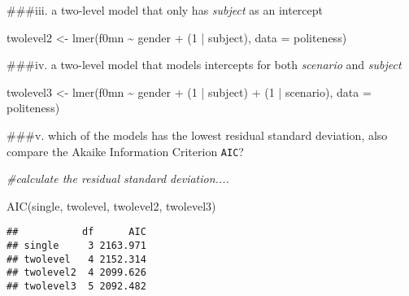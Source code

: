 \documentclass[
]{article}
\newenvironment{Shaded}{\begin{snugshade}}{\end{snugshade}}
\newcommand{\AttributeTok}[1]{\textcolor[rgb]{0.77,0.63,0.00}{#1}}
\newcommand{\CommentTok}[1]{\textcolor[rgb]{0.56,0.35,0.01}{\textit{#1}}}
\newcommand{\DecValTok}[1]{\textcolor[rgb]{0.00,0.00,0.81}{#1}}
\newcommand{\FunctionTok}[1]{\textcolor[rgb]{0.00,0.00,0.00}{#1}}
\newcommand{\NormalTok}[1]{#1}
\newcommand{\OtherTok}[1]{\textcolor[rgb]{0.56,0.35,0.01}{#1}}
\newcommand{\SpecialCharTok}[1]{\textcolor[rgb]{0.00,0.00,0.00}{#1}}
\begin{document}
\#\#\#iii. a two-level model that only has \emph{subject} as an
intercept

\begin{Shaded}
\begin{Highlighting}[]
\NormalTok{twolevel2 }\OtherTok{\textless{}{-}} \FunctionTok{lmer}\NormalTok{(f0mn }\SpecialCharTok{\textasciitilde{}}\NormalTok{ gender }\SpecialCharTok{+}\NormalTok{ (}\DecValTok{1} \SpecialCharTok{|}\NormalTok{ subject), }\AttributeTok{data =}\NormalTok{ politeness)}
\end{Highlighting}
\end{Shaded}

\#\#\#iv. a two-level model that models intercepts for both
\emph{scenario} and \emph{subject}

\begin{Shaded}
\begin{Highlighting}[]
\NormalTok{twolevel3 }\OtherTok{\textless{}{-}} \FunctionTok{lmer}\NormalTok{(f0mn }\SpecialCharTok{\textasciitilde{}}\NormalTok{ gender }\SpecialCharTok{+}\NormalTok{ (}\DecValTok{1} \SpecialCharTok{|}\NormalTok{ subject) }\SpecialCharTok{+}\NormalTok{ (}\DecValTok{1} \SpecialCharTok{|}\NormalTok{ scenario), }\AttributeTok{data =}\NormalTok{ politeness)}
\end{Highlighting}
\end{Shaded}

\#\#\#v. which of the models has the lowest residual standard deviation,
also compare the Akaike Information Criterion \texttt{AIC}?

\begin{Shaded}
\begin{Highlighting}[]
\CommentTok{\#calculate the residual standard deviation....}

\FunctionTok{AIC}\NormalTok{(single, twolevel, twolevel2, twolevel3)}
\end{Highlighting}
\end{Shaded}

\begin{verbatim}
##           df      AIC
## single     3 2163.971
## twolevel   4 2152.314
## twolevel2  4 2099.626
## twolevel3  5 2092.482
\end{verbatim}
\end{document}
